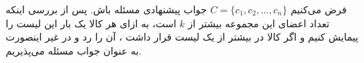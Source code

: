 \documentclass[]{article}
\begin{document}
فرض می‌کنیم $C = \lbrace c_1, c_2, \ldots, c_n \rbrace$
جواب پیشنهادی مسئله باش. پس از بررسی اینکه تعداد اعضای این مجموعه
بیشتر از $k$ است،
به ازای هر کالا یک بار این لیست را پیمایش کنیم و اگر کالا در بیشتر از یک لیست
قرار داشت ، آن را رد و در غیر اینصورت به عنوان جواب مسئله می‌پذیریم.
\end{document}
